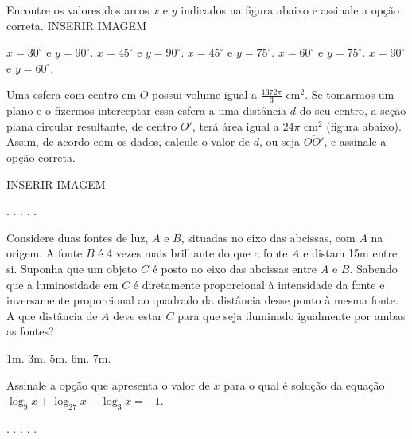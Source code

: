 \begin{question}%
Encontre os valores dos arcos \(x\) e \(y\) indicados na figura abaixo e assinale a opção correta.
INSERIR IMAGEM
    \begin{tasks}
        \task \(x = 30^\circ\) e \(y = 90^\circ\).
        \task \(x = 45^\circ\) e \(y = 90^\circ\).
        \task \(x = 45^\circ\) e \(y = 75^\circ\).
        \task \(x = 60^\circ\) e \(y = 75^\circ\).
        \task \(x = 90^\circ\) e \(y = 60^\circ\).
    \end{tasks}
\end{question}

\begin{question}%
Uma esfera com centro em \(O\) possui volume igual a \(\frac{1372\pi}{3}\) cm\(^2\). Se tomarmos um plano e o fizermos interceptar essa esfera a uma distância \(d\) do seu centro, a seção plana circular resultante, de centro \(O'\), terá área igual a \(24\pi\) cm\(^2\) (figura abaixo). Assim, de acordo com os dados, calcule o valor de \(d\), ou seja \(\overline{OO'}\), e assinale a opção correta.

INSERIR IMAGEM
    \begin{tasks}
        \task 1cm.
        \task 3cm.
        \task 5cm.
        \task 7cm.
        \task 10cm.
    \end{tasks}
\end{question}

\begin{question}%
Considere duas fontes de luz, \(A\) e \(B\), situadas no eixo das abcissas, com \(A\) na origem. A fonte \(B\) é 4 vezes mais brilhante do que a fonte \(A\) e distam 15m entre si. Suponha que um objeto \(C\) é posto no eixo das abcissas entre \(A\) e \(B\). Sabendo que a luminosidade em \(C\) é diretamente proporcional à intensidade da fonte e inversamente proporcional ao quadrado da distância desse ponto à mesma fonte. A que distância de \(A\) deve estar \(C\) para que seja iluminado igualmente por ambas as fontes?
    \begin{tasks}
        \task 1m.
        \task 3m.
        \task 5m.
        \task 6m.
        \task 7m.
    \end{tasks}
\end{question}

\begin{question}%
Assinale a opção que apresenta o valor de \(x\) para o qual é solução da equação \(\log_9 x + \log_{27} x - \log_3 x = -1\).
    \begin{tasks}
        .
        .
        .
        .
        .
    \end{tasks}
\end{question}

